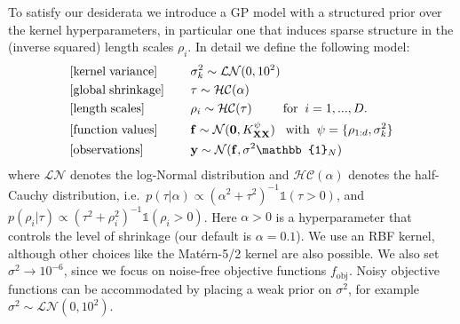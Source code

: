 \documentclass[accepted]{uai2021} %
\newcommand{\fobj}{f_{\text{obj}}}
\newcommand{\by}{\mathbf{y}}
\newcommand{\bff}{\mathbf{f}}
\newcommand{\bX}{\mathbf{X}}
\newcommand{\NN}{\mathcal{N}}
\begin{document}
To satisfy our desiderata we introduce a GP model with a structured prior over the kernel hyperparameters, in particular one that
induces sparse structure in the (inverse squared) length scales $\rho_i$. In detail we define the following model:
\begin{align}
\label{eqn:prior}
&[{\rm kernel \; variance}] \;\;\;\;                 &&\sigma_k^2 \sim \mathcal{LN}(0, 10^2)  \\
&[{\rm global \; shrinkage}] \;\;\;\;      &&\tau \sim  \mathcal{HC}(\alpha)  \nonumber   \\
&[{\rm length \; scales}] \;\;\;\;              && \rho_i \sim  \mathcal{HC}(\tau)  \;\;\;\;\;\;\;\;\; {\rm for} \;\;  i=1,...,D.  \nonumber  \\
&[{\rm function \; values}] \;\;\;\;               &&\bff\sim \NN(\bm{0}, K^{\psi}_{\bX\bX})  \;\;\;
                                                               {\rm with} \;\; \psi = \{\rho_{1:d}, \sigma_k^2\}      \nonumber \\
&[{\rm observations}] \;\;\;\;              && \by \sim \NN(\bff, \sigma^2 \mathbb{1}_N)   \nonumber
\end{align}
where $\mathcal{LN}$ denotes the log-Normal distribution and $\mathcal{HC}(\alpha)$ denotes the half-Cauchy distribution,
i.e.~$p(\tau | \alpha) \propto (\alpha^2 + \tau^2)^{-1}\mathbb{1}(\tau > 0)$, and
$p(\rho_i | \tau) \propto (\tau^2 + \rho_i^2)^{-1}\mathbb{1}(\rho_i > 0)$.
Here $\alpha>0$ is a hyperparameter that controls the level of shrinkage (our default is $\alpha=0.1$).
We use an RBF kernel, although other choices like the Mat\'ern-5/2 kernel are also possible.
We also set $\sigma^2 \to 10^{-6}$, since we focus on noise-free objective functions $\fobj$.
Noisy objective functions can be accommodated by placing a weak prior on $\sigma^2$, for example $\sigma^2 \sim \mathcal{LN}(0, 10^2)$.
\end{document}
